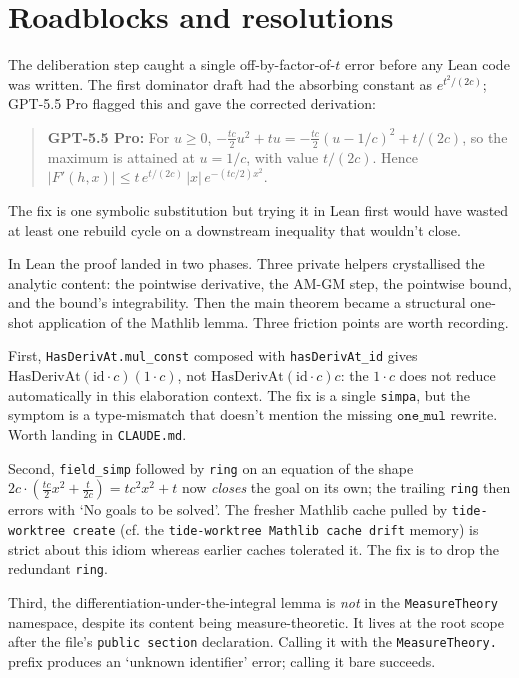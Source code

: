 \documentclass[11pt]{article}
\newcommand{\gptbox}[1]{\par\medskip\begin{quote}\small\textbf{\textcolor{green!50!black}{GPT-5.5 Pro:}} #1\end{quote}\medskip}
\begin{document}
\section{Roadblocks and resolutions}

The deliberation step caught a single off-by-factor-of-\(t\) error
before any Lean code was written. The first dominator draft had the
absorbing constant as \(e^{t^2/(2c)}\); GPT-5.5 Pro flagged this and
gave the corrected derivation:
\gptbox{For \(u \ge 0\),
\(-\tfrac{tc}{2}u^2 + tu = -\tfrac{tc}{2}(u - 1/c)^2 + t/(2c)\),
so the maximum is attained at \(u = 1/c\), with value \(t/(2c)\).
Hence \(|F'(h, x)| \le t\,e^{t/(2c)}\,|x|\,e^{-(tc/2)x^2}\).}
The fix is one symbolic substitution but trying it in Lean first
would have wasted at least one rebuild cycle on a downstream
inequality that wouldn't close.

In Lean the proof landed in two phases. Three private helpers
crystallised the analytic content: the pointwise derivative, the
AM-GM step, the pointwise bound, and the bound's integrability. Then
the main theorem became a structural one-shot application of the
Mathlib lemma. Three friction points are worth recording.

First, \texttt{HasDerivAt.mul\_const} composed with
\texttt{hasDerivAt\_id} gives \(\mathrm{HasDerivAt} (\mathrm{id} \cdot
c) (1 \cdot c)\), not \(\mathrm{HasDerivAt} (\mathrm{id} \cdot c) c\):
the \(1 \cdot c\) does not reduce automatically in this elaboration
context. The fix is a single \texttt{simpa}, but the symptom is a
type-mismatch that doesn't mention the missing \(\mathtt{one\_mul}\)
rewrite. Worth landing in \texttt{CLAUDE.md}.

Second, \texttt{field\_simp} followed by \texttt{ring} on an
equation of the shape \(2c \cdot (\tfrac{tc}{2} x^2 + \tfrac{t}{2c})
= tc^2 x^2 + t\) now \emph{closes} the goal on its own; the trailing
\texttt{ring} then errors with `No goals to be solved'. The fresher
Mathlib cache pulled by \texttt{tide-worktree create} (cf. the
\texttt{tide-worktree Mathlib cache drift} memory) is strict about
this idiom whereas earlier caches tolerated it. The fix is to drop
the redundant \texttt{ring}.

Third, the differentiation-under-the-integral lemma is \emph{not}
in the \texttt{MeasureTheory} namespace, despite its content being
measure-theoretic. It lives at the root scope after the file's
\texttt{public section} declaration. Calling it with the
\texttt{MeasureTheory.} prefix produces an `unknown identifier'
error; calling it bare succeeds.
\end{document}
